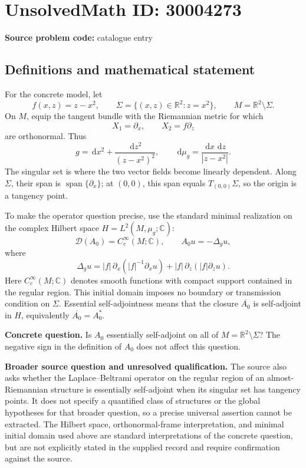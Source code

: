 \documentclass[11pt]{article}
\newcommand{\R}{\mathbb{R}}
\newcommand{\C}{\mathbb{C}}
\newcommand{\dd}{\,\mathrm{d}}
\begin{document}
\section*{UnsolvedMath ID: 30004273}
\textbf{Source problem code:} catalogue entry
\subsection{Definitions and mathematical statement}
For the concrete model, let
\[
f(x,z)=z-x^2,\qquad \Sigma=\{(x,z)\in\R^2:z=x^2\},\qquad M=\R^2\setminus\Sigma.
\]
On \(M\), equip the tangent bundle with the Riemannian metric for which
\[
X_1=\partial_x,\qquad X_2=f\partial_z
\]
are orthonormal. Thus
\[
g=\dd x^2+\frac{\dd z^2}{(z-x^2)^2},\qquad \dd\mu_g=\frac{\dd x\,\dd z}{|z-x^2|}.
\]
The singular set is where the two vector fields become linearly dependent. Along \(\Sigma\), their span is \(\operatorname{span}\{\partial_x\}\); at \((0,0)\), this span equals \(T_{(0,0)}\Sigma\), so the origin is a tangency point.

To make the operator question precise, use the standard minimal realization on the complex Hilbert space \(H=L^2(M,\mu_g;\C)\):
\[
\mathcal D(A_0)=C_c^\infty(M;\C),\qquad A_0u=-\Delta_g u,
\]
where
\[
\Delta_g u
=|f|\,\partial_x\!\left(|f|^{-1}\partial_xu\right)
 +|f|\,\partial_z\!\left(|f|\partial_zu\right).
\]
Here \(C_c^\infty(M;\C)\) denotes smooth functions with compact support contained in the regular region. This initial domain imposes no boundary or transmission condition on \(\Sigma\). Essential self-adjointness means that the closure \(\overline{A_0}\) is self-adjoint in \(H\), equivalently \(\overline{A_0}=A_0^*\).

\textbf{Concrete question.} Is \(A_0\) essentially self-adjoint on all of \(M=\R^2\setminus\Sigma\)? The negative sign in the definition of \(A_0\) does not affect this question.

\textbf{Broader source question and unresolved qualification.} The source also asks whether the Laplace--Beltrami operator on the regular region of an almost-Riemannian structure is essentially self-adjoint when its singular set has tangency points. It does not specify a quantified class of structures or the global hypotheses for that broader question, so a precise universal assertion cannot be extracted. The Hilbert space, orthonormal-frame interpretation, and minimal initial domain used above are standard interpretations of the concrete question, but are not explicitly stated in the supplied record and require confirmation against the source.
\end{document}

